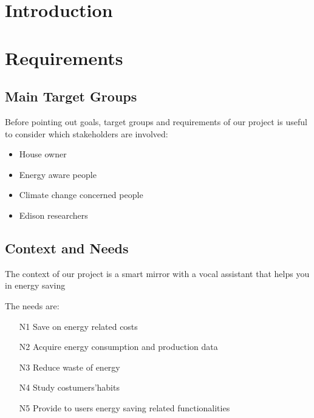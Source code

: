 \documentclass{article}
\begin{document}
\section{Introduction}

\newpage

\section{Requirements}
    \subsection{Main Target Groups}
    Before pointing out goals, target groups and requirements of our project is useful to consider which stakeholders are involved:
        \begin{itemize}
            \item House owner
            \item Energy aware people
            \item Climate change concerned people
            \item Edison researchers
        \end{itemize}
    \subsection{Context and Needs}
        The context of our project is a smart mirror with a vocal assistant that helps you in energy saving %

        

        The needs are:
        \begin{itemize}
            \item[N1] Save on energy related costs
            \item[N2] Acquire energy consumption and production data
            \item[N3] Reduce waste of energy
            \item[N4] Study costumers'habits
            \item[N5] Provide to users energy saving related functionalities
        \end{itemize}
\end{document}
